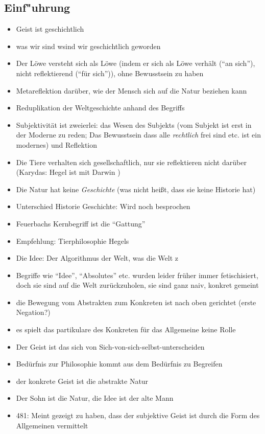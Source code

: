 \documentclass[emulatestandardclasses]{scrartcl}
\begin{document}
\subsection{Einf"uhrung}

\begin{itemize}
  \item Geist ist geschichtlich
  \item was wir sind wsind wir geschichtlich geworden
  \item Der Löwe versteht sich als Löwe (indem er sich als Löwe verhält ("`an sich"'), nicht reflektierend ("`für sich"')), ohne Bewusstsein zu haben
  \item Metareflektion darüber, wie der Mensch sich auf die Natur beziehen kann
  \item Reduplikation der Weltgeschichte anhand des Begriffs
  \item Subjektivität ist zweierlei: das Wesen des Subjekts (vom Subjekt ist erst in der Moderne zu reden; Das Bewusstsein dass alle \emph{rechtlich} frei sind etc. ist ein modernes) und Reflektion
  \item Die Tiere verhalten sich gesellschaftlich, nur sie reflektieren nicht darüber (Karydas: Hegel ist mit Darwin )
  \item Die Natur hat keine \emph{Geschichte} (was nicht heißt, dass sie keine Historie hat)
  \item Unterschied Historie Geschichte: Wird noch besprochen
  \item Feuerbachs Kernbegriff ist die "`Gattung"'
  \item Empfehlung: Tierphilosophie Hegels
  \item Die Idee: Der Algorithmus der Welt, was die Welt z
  \item Begriffe wie "`Idee"', "`Absolutes"' etc. wurden leider früher immer fetischisiert, doch sie sind auf die Welt zurückzuholen, sie sind ganz naiv, konkret gemeint
  \item die Bewegung vom Abstrakten zum Konkreten ist nach oben gerichtet (erste Negation?)
  \item es spielt das partikulare des Konkreten für das Allgemeine keine Rolle
  \item Der Geist ist das sich von Sich-von-sich-selbst-unterscheiden
  \item Bedürfnis zur Philosophie kommt aus dem Bedürfnis zu Begreifen
  \item der konkrete Geist ist die abstrakte Natur
  \item Der Sohn ist die Natur, die Idee ist der alte Mann
  \item  481: Meint gezeigt zu haben, dass der subjektive Geist ist durch die Form des Allgemeinen vermittelt
\end{itemize}
\end{document}

